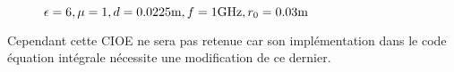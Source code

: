 \begin{figure}[!hbt]
          \caption[CIOE sur empilement de Hoppe & Rahmat-Samii p.~62]{\(\epsilon = 6, \mu = 1, d=0.0225\text{m}, f=1\text{GHz}, r_0=0.03\text{m}\)}
          \label{fig:imp_fourier:plan:hoppe:62:hoibc:ibc6}
      \end{figure}

      Cependant cette CIOE ne sera pas retenue car son implémentation dans le code équation intégrale nécessite une modification de ce dernier.